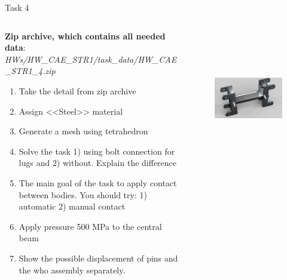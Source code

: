 \documentclass[aspectratio=169]{beamer}
\newcommand{\fbckg}[1]{\usebackgroundtemplate{\texttt{[image: \#1]}}}%
\begin{document}
\begin{frame}[t]{Task 4}
    \vspace{-0.4cm}
    \begin{columns}[T,onlytextwidth]
        \begin{column}{0.54\textwidth}
            \scriptsize
            \textbf{Zip archive, which contains all needed data}: \textit{HWs/HW\_CAE\_STR1/task\_data/HW\_CAE\_STR1\_4.zip}
            \begin{enumerate}
                \item Take the detail from zip archive
                \item Assign <<Steel>> material
                \item Generate a mesh using tetrahedron
                \item Solve the task 1) using bolt connection for lugs and 2) without. Explain the difference
                \item The main goal of the task to apply contact between bodies. You should try: 1) automatic 2) manual contact
                \item Apply pressure 500 MPa to the central beam
                \item Show the possible displacement of pins and the who assembly separately.
            \end{enumerate}
        \end{column}
        \begin{column}{0.45\textwidth}
            \vspace{0.5cm}
            \begin{figure}[H]
                \centering\includegraphics[height=6cm,width=1\textwidth,keepaspectratio]{HW_CAE_STR1_4.png}
                \label{fig:HW_CAE_STR1_4.png}
            \end{figure}
        \end{column}
    \end{columns}
\end{frame}

\fbckg{fibeamer/figs/last_page.png}
\frame[plain]{}
\end{document}
